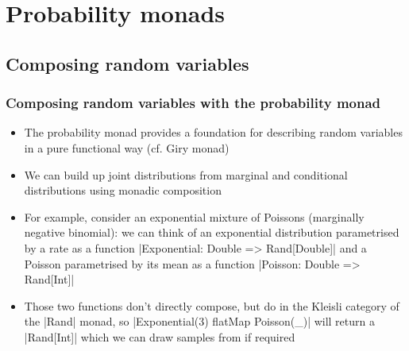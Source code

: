 \documentclass[mathserif,handout]{beamer}
\begin{document}

\section{Probability monads}

\subsection{Composing random variables}

\begin{frame}[fragile]
  \frametitle{Composing random variables with the probability monad}
  \begin{itemize}
  \item The \alert{probability monad} provides a foundation for describing random variables in a pure functional way (cf. \alert{Giry monad})
  \item We can build up joint distributions from marginal and conditional distributions using \alert{monadic composition}
  \item For example, consider an exponential mixture of Poissons (marginally negative binomial): we can think of an exponential distribution parametrised by a rate as a function |Exponential: Double => Rand[Double]| and a Poisson parametrised by its mean as a function |Poisson: Double => Rand[Int]|
    \item Those two functions don't directly compose, but do in the Kleisli category of the |Rand| monad, so |Exponential(3) flatMap {Poisson(_)}| will return a |Rand[Int]| which we can draw samples from if required
  \end{itemize}
\end{frame}
\end{document}
